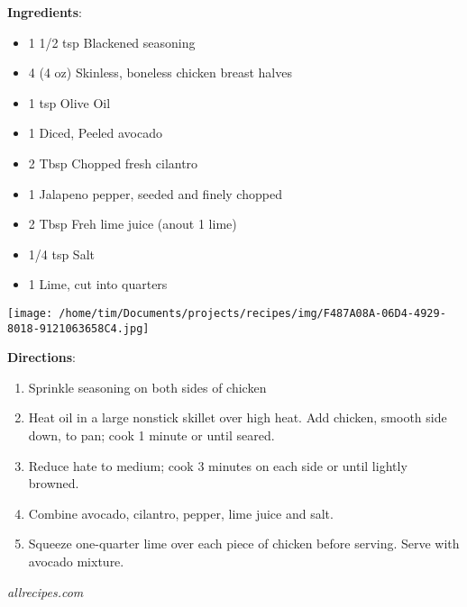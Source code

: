 \documentclass[11pt, twoside, openany]{book}
\begin{document}
\begin{minipage}[t]{0.8\linewidth}
\textbf{Ingredients}:\vspace{-3mm}
\begin{multicols}{2}
\begin{itemize}\setlength\itemsep{-1mm}
\item 1 1/2 tsp Blackened seasoning
\item 4 (4 oz) Skinless, boneless chicken breast halves
\item 1 tsp Olive Oil
\item 1 Diced, Peeled avocado
\item 2 Tbsp Chopped fresh cilantro
\item 1 Jalapeno pepper, seeded and finely chopped
\item 2 Tbsp Freh lime juice (anout 1 lime)
\item 1/4 tsp Salt
\item 1 Lime, cut into quarters
\end{itemize}
\end{multicols}
\end{minipage}
\begin{minipage}[t]{0.2\linewidth}
\centering \strut\vspace*{-\baselineskip}\newline
\texttt{[image: /home/tim/Documents/projects/recipes/img/F487A08A-06D4-4929-8018-9121063658C4.jpg]}\\
\end{minipage}\vspace{3mm}
\textbf{Directions}:
\vspace{-3mm}\begin{enumerate}\setlength\itemsep{-1mm}
\item Sprinkle seasoning on both sides of chicken
\item Heat oil in a large nonstick skillet over high heat. Add chicken, smooth side down, to pan; cook 1 minute or until seared.
\item Reduce hate to medium; cook 3 minutes on each side or until lightly browned.
\item Combine avocado, cilantro, pepper, lime juice and salt.
\item Squeeze one-quarter lime over each piece of chicken before serving. Serve with avocado mixture.
\end{enumerate}
 \label{simple-white-cake}\hfill\textit{allrecipes.com}\\
\end{document}
